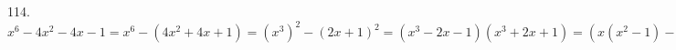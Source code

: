 114. $x^6-4x^2-4x-1=x^6-(4x^2+4x+1)=(x^3)^2-(2x+1)^2=(x^3-2x-1)(x^3+2x+1)=(x(x^2-1)-(x+1))(x^3+2x+1)=
(x(x-1)(x+1)-(x+1))(x^3+2x+1)=(x+1)(x^3+2x+1)(x^2-x-1).$\\
